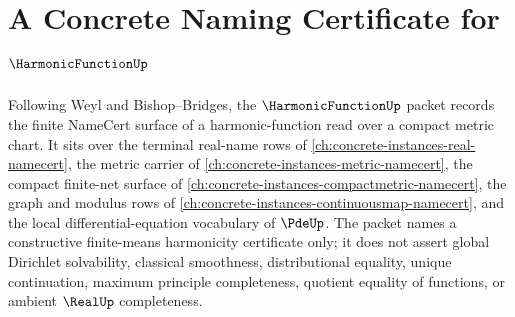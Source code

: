 \chapter{A Concrete Naming Certificate for $\HarmonicFunctionUp$}
\label{ch:concrete-instances-harmonic-function-namecert}

Following Weyl and Bishop--Bridges, the $\HarmonicFunctionUp$ packet records the finite NameCert surface of a harmonic-function read over a compact metric chart. It sits over the terminal real-name rows of \autoref{ch:concrete-instances-real-namecert}, the metric carrier of \autoref{ch:concrete-instances-metric-namecert}, the compact finite-net surface of \autoref{ch:concrete-instances-compactmetric-namecert}, the graph and modulus rows of \autoref{ch:concrete-instances-continuousmap-namecert}, and the local differential-equation vocabulary of $\PdeUp$. The packet names a constructive finite-means harmonicity certificate only; it does not assert global Dirichlet solvability, classical smoothness, distributional equality, unique continuation, maximum principle completeness, quotient equality of functions, or ambient $\RealUp$ completeness.

